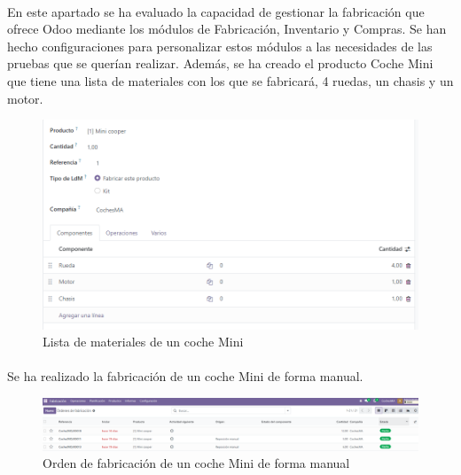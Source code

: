 \paragraph{}
En este apartado se ha evaluado la capacidad de gestionar la fabricación que ofrece Odoo mediante los módulos de Fabricación, Inventario y Compras. Se han hecho configuraciones para personalizar estos módulos a las necesidades de las pruebas que se querían realizar. Además, se ha creado el producto Coche Mini que tiene una lista de materiales con los que se fabricará, 4 ruedas, un chasis y un motor.
\newpage
\begin{figure}[h]
    \centering
    \includegraphics[width=1\linewidth]{fotosGestFab/coche.png}
    \caption{Lista de materiales de un coche Mini}
    \label{fig:enter-label}
\end{figure}
\paragraph{}
Se ha realizado la fabricación de un coche Mini de forma manual.
\begin{figure}[h]
    \centering
    \includegraphics[width=1\linewidth]{fotosGestFab/manual.png}
    \caption{Orden de fabricación de un coche Mini de forma manual}
    \label{fig:enter-label}
\end{figure}
